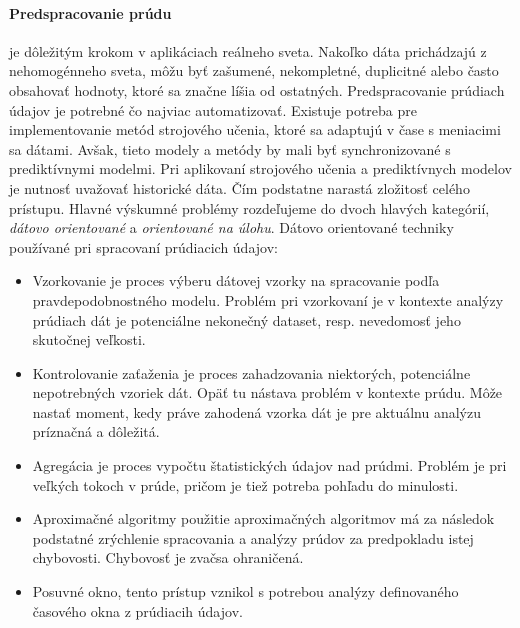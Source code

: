 \documentclass[11pt]{article}
\begin{document}
\paragraph{Predspracovanie prúdu} je dôležitým krokom v aplikáciach reálneho sveta. Nakoľko dáta prichádzajú z nehomogénneho sveta, môžu byť zašumené, nekompletné, duplicitné alebo často obsahovať hodnoty, ktoré sa značne líšia od ostatných. Predspracovanie prúdiach údajov je potrebné čo najviac automatizovať. Existuje potreba pre implementovanie metód  strojového učenia, ktoré sa adaptujú v čase s meniacimi sa dátami. Avšak, tieto modely a metódy by mali byť synchronizované s prediktívnymi modelmi. Pri aplikovaní strojového učenia a prediktívnych modelov je nutnosť uvažovať historické dáta. Čím podstatne narastá zložitosť celého prístupu. Hlavné výskumné problémy rozdeľujeme do dvoch hlavých kategórií, \textit{dátovo orientované} a \textit{orientované na úlohu}. Dátovo orientované techniky používané pri spracovaní prúdiacich údajov: \newline
\begin{itemize}
	\item Vzorkovanie je proces výberu dátovej vzorky na spracovanie podľa pravdepodobnostného modelu. Problém pri vzorkovaní je v kontexte analýzy prúdiach dát je potenciálne nekonečný dataset, resp. nevedomosť jeho skutočnej veľkosti.
	\item Kontrolovanie zaťaženia je proces zahadzovania niektorých, potenciálne nepotrebných vzoriek dát. Opäť tu nástava problém v kontexte prúdu. Môže nastať moment, kedy práve zahodená vzorka dát je pre aktuálnu analýzu príznačná a dôležitá.
	\item Agregácia je proces vypočtu štatistických údajov nad prúdmi. Problém je pri veľkých tokoch v prúde, pričom je tiež potreba pohľadu do minulosti.
\end{itemize}
\begin{itemize}
	\item Aproximačné algoritmy použitie aproximačných algoritmov má za následok podstatné zrýchlenie spracovania a analýzy prúdov za predpokladu istej chybovosti. Chybovosť je zvačsa ohraničená.
	\item Posuvné okno, tento prístup vznikol s potrebou analýzy definovaného časového okna z prúdiacih údajov.
\end{itemize}
\end{document}

